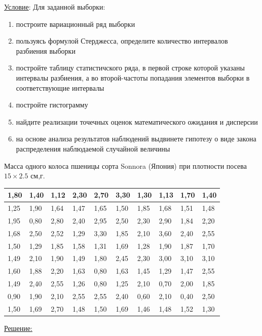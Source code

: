 \documentclass[a4paper,12pt]{article} %
\begin{document}
\underline{Условие}: Для заданной выборки:\\
\begin{enumerate}
  \item построите вариационный ряд выборки
  \item пользуясь формулой Стерджесса, определите количество интервалов
  разбиения выборки
  \item постройте таблицу статистичского ряда, в первой строке которой указаны
  интервалы разбиения, а во второй-частоты попадания элементов выборки в
  соответствующие интервалы
  \item постройте гистограмму
  \item найдите реализации точечных оценок математического ожидания и дисперсии
  \item на основе анализа результатов наблюдений выдвинете гипотезу о виде закона
  распределения наблюдаемой случайной величины
\end{enumerate}
Масса одного колоса пшеницы сорта Sonnora (Япония) при плотности посева
$15\times2.5$ см,г.\\
\begin{center}
\begin{tabular}{ | l | l | l | l | l | l | l | l | l | l | }
\hline
	1,80 & 1,40 & 1,12 & 2,30 & 2,70 & 3,30 & 1,30 & 1,13 & 1,70 & 1,40 \\ \hline
	1,25 & 1,90 & 1,64 & 1,47 & 1,65 & 1,50 & 1,85 & 1,68 & 1,51 & 1,48 \\ \hline
	1,95 & 0,80 & 2,80 & 2,40 & 2,95 & 2,50 & 2,30 & 2,90 & 1,84 & 2,20 \\ \hline
	1,68 & 2,50 & 2,52 & 1,29 & 3,30 & 1,85 & 2,10 & 3,60 & 2,40 & 2,55 \\ \hline
	1,50 & 1,29 & 1,85 & 1,58 & 1,31 & 1,69 & 1,28 & 1,90 & 1,87 & 1,70 \\ \hline
	1,49 & 2,10 & 1,90 & 1,49 & 1,80 & 2,45 & 2,30 & 3,00 & 3,10 & 3,10 \\ \hline
	1,60 & 1,88 & 2,20 & 1,63 & 0,80 & 1,63 & 1,45 & 1,29 & 1,47 & 2,55 \\ \hline
	1,49 & 2,40 & 2,55 & 1,26 & 0,80 & 1,25 & 2,10 & 0,70 & 2,00 & 1,85 \\ \hline
	0,90 & 1,90 & 2,10 & 2,55 & 2,55 & 2,40 & 0,60 & 2,10 & 0,40 & 2,50 \\ \hline
	1,50 & 1,69 & 2,70 & 1,48 & 1,50 & 1,69 & 1,46 & 1,48 & 1,52 & 1,30 \\ \hline
\end{tabular}
\end{center}
\underline{Решение:}\\
\end{document}
